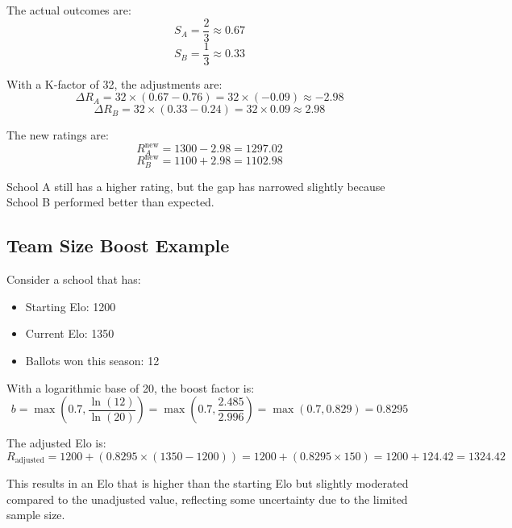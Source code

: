 \documentclass[11pt]{article}
\begin{document}
The actual outcomes are:
\begin{equation}
S_A = \frac{2}{3} \approx 0.67
\end{equation}
\begin{equation}
S_B = \frac{1}{3} \approx 0.33
\end{equation}

With a K-factor of 32, the adjustments are:
\begin{equation}
\Delta R_A = 32 \times (0.67 - 0.76) = 32 \times (-0.09) \approx -2.98
\end{equation}
\begin{equation}
\Delta R_B = 32 \times (0.33 - 0.24) = 32 \times 0.09 \approx 2.98
\end{equation}

The new ratings are:
\begin{equation}
R_A^{\text{new}} = 1300 - 2.98 = 1297.02
\end{equation}
\begin{equation}
R_B^{\text{new}} = 1100 + 2.98 = 1102.98
\end{equation}

School A still has a higher rating, but the gap has narrowed slightly because School B performed better than expected.

\subsection{Team Size Boost Example}

Consider a school that has:
\begin{itemize}
    \item Starting Elo: 1200
    \item Current Elo: 1350
    \item Ballots won this season: 12
\end{itemize}

With a logarithmic base of 20, the boost factor is:
\begin{equation}
b = \max\left(0.7, \frac{\ln(12)}{\ln(20)}\right) = \max\left(0.7, \frac{2.485}{2.996}\right) = \max(0.7, 0.829) = 0.8295
\end{equation}

The adjusted Elo is:
\begin{equation}
R_{\text{adjusted}} = 1200 + (0.8295 \times (1350 - 1200)) = 1200 + (0.8295 \times 150) = 1200 + 124.42 = 1324.42
\end{equation}

This results in an Elo that is higher than the starting Elo but slightly moderated compared to the unadjusted value, reflecting some uncertainty due to the limited sample size.
\end{document}
